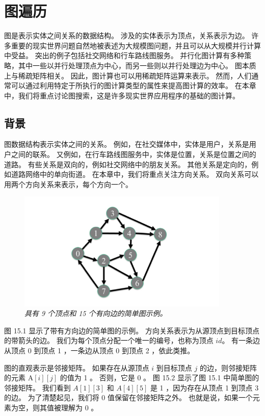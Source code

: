 \section{图遍历}
图是表示实体之间关系的数据结构。 涉及的实体表示为顶点，关系表示为边。 
许多重要的现实世界问题自然地被表述为大规模图问题，并且可以从大规模并行计算中受益。 突出的例子包括社交网络和行车路线图服务。 
并行化图计算有多种策略，其中一些以并行处理顶点为中心，而另一些则以并行处理边为中心。 图本质上与稀疏矩阵相关。 
因此，图计算也可以用稀疏矩阵运算来表示。 然而，人们通常可以通过利用特定于所执行的图计算类型的属性来提高图计算的效率。 
在本章中，我们将重点讨论图搜索，这是许多现实世界应用程序的基础的图计算。

\subsection{背景}
图数据结构表示实体之间的关系。 例如，在社交媒体中，实体是用户，关系是用户之间的联系。 
又例如，在行车路线图服务中，实体是位置，关系是位置之间的道路。 有些关系是双向的，例如社交网络中的朋友关系。 
其他关系是定向的，例如道路网络中的单向街道。 在本章中，我们将重点关注方向关系。 
双向关系可以用两个方向关系来表示，每个方向一个。

\begin{figure}[H]
	\centering
	\includegraphics[width=0.9\textwidth]{figs/F15.1.png}
	\caption{\textit{具有 9 个顶点和 15 个有向边的简单图示例。}}
\end{figure}

图 15.1 显示了带有方向边的简单图的示例。 方向关系表示为从源顶点到目标顶点的带箭头的边。 
我们为每个顶点分配一个唯一的编号，也称为顶点 $i d$。 有一条边从顶点 0 到顶点 1 ，一条边从顶点 0 到顶点 2 ，依此类推。

图的直观表示是邻接矩阵。 如果存在从源顶点 $i$ 到目标顶点 $j$ 的边，则邻接矩阵的元素 $\mathrm{A}[i][j]$ 的值为 1 。 
否则，它是 0 。 图 15.2 显示了图 15.1 中简单图的邻接矩阵。 
我们看到 $A[1][3]$ 和 $A[4][5]$ 是 1 ，因为存在从顶点 1 到顶点 3 的边。 为了清楚起见，我们将 0 值保留在邻接矩阵之外。 
也就是说，如果一个元素为空，则其值被理解为 0 。

